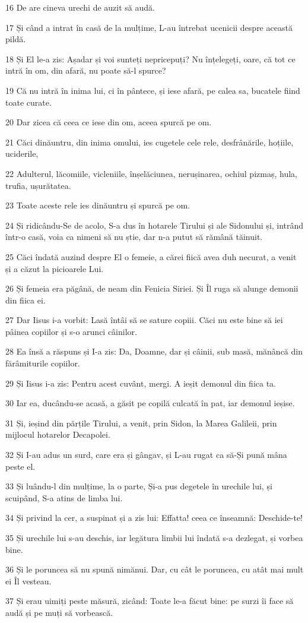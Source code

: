 \par 16 De are cineva urechi de auzit să audă.
\par 17 Și când a intrat în casă de la mulțime, L-au întrebat ucenicii despre această pildă.
\par 18 Și El le-a zis: Așadar și voi sunteți nepricepuți? Nu înțelegeți, oare, că tot ce intră în om, din afară, nu poate să-l spurce?
\par 19 Că nu intră în inima lui, ci în pântece, și iese afară, pe calea sa, bucatele fiind toate curate.
\par 20 Dar zicea că ceea ce iese din om, aceea spurcă pe om.
\par 21 Căci dinăuntru, din inima omului, ies cugetele cele rele, desfrânările, hoțiile, uciderile,
\par 22 Adulterul, lăcomiile, vicleniile, înșelăciunea, nerușinarea, ochiul pizmaș, hula, trufia, ușurătatea.
\par 23 Toate aceste rele ies dinăuntru și spurcă pe om.
\par 24 Și ridicându-Se de acolo, S-a dus în hotarele Tirului și ale Sidonului și, intrând într-o casă, voia ca nimeni să nu știe, dar n-a putut să rămână tăinuit.
\par 25 Căci îndată auzind despre El o femeie, a cărei fiică avea duh necurat, a venit și a căzut la picioarele Lui.
\par 26 Și femeia era păgână, de neam din Fenicia Siriei. Și Îl ruga să alunge demonii din fiica ei.
\par 27 Dar Iisus i-a vorbit: Lasă întâi să se sature copiii. Căci nu este bine să iei pâinea copiilor și s-o arunci câinilor.
\par 28 Ea însă a răspuns și I-a zis: Da, Doamne, dar și câinii, sub masă, mănâncă din fărâmiturile copiilor.
\par 29 Și Iisus i-a zis: Pentru acest cuvânt, mergi. A ieșit demonul din fiica ta.
\par 30 Iar ea, ducându-se acasă, a găsit pe copilă culcată în pat, iar demonul ieșise.
\par 31 Și, ieșind din părțile Tirului, a venit, prin Sidon, la Marea Galileii, prin mijlocul hotarelor Decapolei.
\par 32 Și I-au adus un surd, care era și gângav, și L-au rugat ca să-Și pună mâna peste el.
\par 33 Și luându-l din mulțime, la o parte, Și-a pus degetele în urechile lui, și scuipând, S-a atins de limba lui.
\par 34 Și privind la cer, a suspinat și a zis lui: Effatta! ceea ce înseamnă: Deschide-te!
\par 35 Și urechile lui s-au deschis, iar legătura limbii lui îndată s-a dezlegat, și vorbea bine.
\par 36 Și le poruncea să nu spună nimănui. Dar, cu cât le poruncea, cu atât mai mult ei Îl vesteau.
\par 37 Și erau uimiți peste măsură, zicând: Toate le-a făcut bine: pe surzi îi face să audă și pe muți să vorbească.

